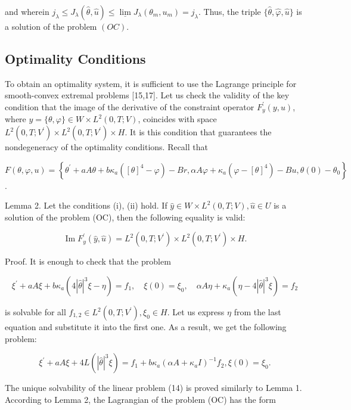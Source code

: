 and wherein $j_{\lambda} \leq J_{\lambda}(\widehat{\theta}, \widehat{u}) \leq \underline{\lim } J_{\lambda}\left(\theta_{m}, u_{m}\right)=j_{\lambda}$. Thus, the triple $\{\widehat{\theta}, \widehat{\varphi}, \widehat{u}\}$ is a solution of the problem $(O C)$.

\subsection{Optimality Conditions}
To obtain an optimality system, it is sufficient to use the Lagrange principle for smooth-convex extremal problems [15,17]. Let us check the validity of the key condition that the image of the derivative of the constraint operator $F_{y}^{\prime}(y, u)$, where $y=\{\theta, \varphi\} \in W \times L^{2}(0, T ; V)$, coincides with space $L^{2}\left(0, T ; V^{\prime}\right) \times L^{2}\left(0, T ; V^{\prime}\right) \times H$. It is this condition that guarantees the nondegeneracy of the optimality conditions. Recall that

$F(\theta, \varphi, u)=\left\{\theta^{\prime}+a A \theta+b \kappa_{a}\left([\theta]^{4}-\varphi\right)-B r, \alpha A \varphi+\kappa_{a}\left(\varphi-[\theta]^{4}\right)-B u, \theta(0)-\theta_{0}\right\}$.

Lemma 2. Let the conditions (i), (ii) hold. If $\widehat{y} \in W \times L^{2}(0, T ; V), \widehat{u} \in U$ is a solution of the problem (OC), then the following equality is valid:

$$
\operatorname{Im} F_{y}^{\prime}(\widehat{y}, \widehat{u})=L^{2}\left(0, T ; V^{\prime}\right) \times L^{2}\left(0, T ; V^{\prime}\right) \times H .
$$

Proof. It is enough to check that the problem

$$
\xi^{\prime}+a A \xi+b \kappa_{a}\left(4|\widehat{\theta}|^{3} \xi-\eta\right)=f_{1}, \quad \xi(0)=\xi_{0}, \quad \alpha A \eta+\kappa_{a}\left(\eta-4|\widehat{\theta}|^{3} \xi\right)=f_{2}
$$

is solvable for all $f_{1,2} \in L^{2}\left(0, T ; V^{\prime}\right), \xi_{0} \in H$. Let us express $\eta$ from the last equation and substitute it into the first one. As a result, we get the following problem:

$$
\xi^{\prime}+a A \xi+4 L\left(|\widehat{\theta}|^{3} \xi\right)=f_{1}+b \kappa_{a}\left(\alpha A+\kappa_{a} I\right)^{-1} f_{2}, \xi(0)=\xi_{0} .
$$

The unique solvability of the linear problem (14) is proved similarly to Lemma 1. According to Lemma 2, the Lagrangian of the problem (OC) has the form

